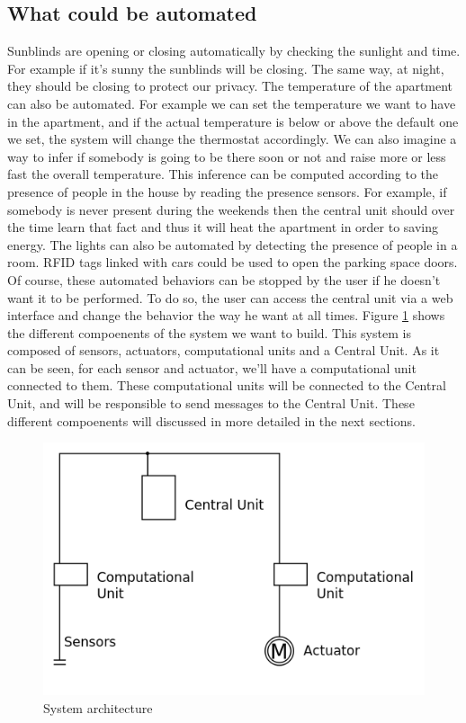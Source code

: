 \documentclass{acm_proc_article-sp}
\begin{document}
\subsection{What could be automated}
Sunblinds are opening or closing automatically by checking the sunlight and time. 
For example if it's sunny the sunblinds will be closing. The same way, at night, they should be closing to protect our privacy.
The temperature of the apartment can also be automated. For example we can set the temperature we want to have in the apartment, 
and if the actual temperature is below or above the default one we set, the system will change the thermostat accordingly. 
We can also imagine a way to infer if somebody is going to be there soon or not and raise more or less fast the overall temperature. 
This inference can be computed according to the presence of people in the house by reading the presence sensors. 
For example, if somebody is never present during the weekends then the central unit should over the time learn that fact and thus it will heat the apartment in order to saving energy.
The lights can also be automated by detecting the presence of people in a room.
RFID tags linked with cars could be used to open the parking space doors.
Of course, these automated behaviors can be stopped by the user if he doesn't want it to be performed. 
To do so, the user can access the central unit via a web interface and change the behavior the way he want at all times.
Figure \ref{architecture} shows the different compoenents of the system we want to build. This system is composed of sensors, actuators, computational units and a Central Unit. 
As it can be seen, for each sensor and actuator, we'll have a computational unit connected to them. These computational units will be connected to the Central Unit, and will be responsible to send messages to the Central Unit. 
These different compoenents will discussed in more detailed in the next sections.
				\begin{figure}[htb]
  				\begin{center}
    				\includegraphics[width=\linewidth]{architecture}
    				\caption{System architecture \label{architecture}}
  				\end{center}
				\end{figure}
\end{document}
